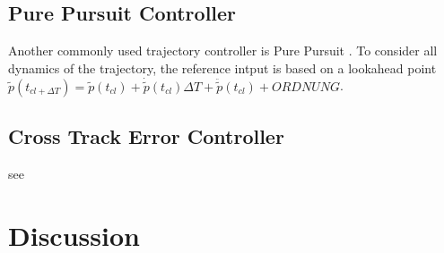 \subsection{Pure Pursuit Controller}
Another commonly used trajectory controller is Pure Pursuit \cite{snider}. To consider all dynamics of the trajectory, the reference intput is based on a lookahead point $\tilde{p}(t_{cl+\Delta T}) = \tilde{p}(t_{cl}) + \dot{\tilde{p}}(t_{cl})\Delta T + \ddot{\tilde{p}}(t_{cl}) + ORDNUNG$.
\subsection{Cross Track Error Controller}
see \cite{williams}

\section{Discussion}
\label{sec:discussion}

